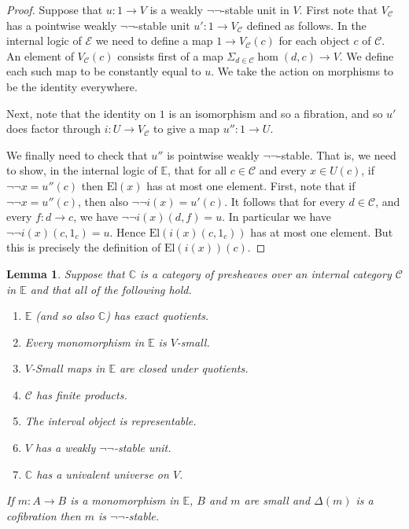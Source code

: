 \documentclass[a4paper]{amsart}
\newtheorem{lemma}[theorem]{Lemma}
\theoremstyle{definition}
\newcommand{\cat}[1]{\mathbb{#1}}
\newcommand{\catc}{\cat{C}}
\newcommand{\smcat}[1]{\mathcal{#1}}
\newcommand{\elu}{\mathrm{El}}
\newcommand{\elv}{\mathrm{El}}
\begin{document}
\begin{proof}
  Suppose that $u \colon 1 \to V$ is a weakly $\neg \neg$-stable
  unit in $V$. First note that $V_\smcat{C}$ has a pointwise weakly
  $\neg \neg$-stable unit $u' \colon 1 \to V_\smcat{C}$ defined as
  follows. In the internal logic of $\smcat{E}$ we need to define a
  map $1 \to V_\smcat{C}(c)$ for each object $c$ of $\smcat{C}$. An
  element of $V_\smcat{C}(c)$ consists first of a map $\Sigma_{d \in
    \smcat{C}} \hom(d, c) \to V$. We define each such map to be constantly
  equal to $u$. We take the action on morphisms to be the identity
  everywhere.
  
  Next, note that the identity on $1$ is an isomorphism and so a
  fibration, and so $u'$ does factor through
  $i \colon U \to V_\smcat{C}$ to give a map $u'' \colon 1 \to U$.

  We finally need to check that $u''$ is pointwise weakly $\neg
  \neg$-stable. That is, we need to show, in the internal logic of
  $\cat{E}$, that for all $c \in \smcat{C}$ and every $x \in U(c)$, if
  $\neg \neg x = u''(c)$ then $\elu(x)$ has at most one element. First,
  note that if $\neg \neg x = u''(c)$, then also $\neg \neg i(x) =
  u'(c)$. It follows that for every $d \in \smcat{C}$, and every
  $f \colon d \to c$, we have $\neg \neg i(x)(d, f) = u$. In
  particular we have $\neg \neg i(x)(c, 1_c) = u$. Hence $\elv(i(x)(c,
  1_c))$ has at most one element. But this is precisely the definition
  of $\elv(i(x))(c)$.
\end{proof}

\begin{lemma}
  \label{lem:negnegunittocof}
  Suppose that $\catc$ is a category of presheaves over an
  internal category $\smcat{C}$ in $\cat{E}$ and that all of the
  following hold.
  \begin{enumerate}
  \item $\cat{E}$ (and so also $\catc$) has exact quotients.
  \item Every monomorphism in $\cat{E}$ is $V$-small.
  \item $V$-Small maps in $\cat{E}$ are closed under quotients.
  \item $\smcat{C}$ has finite products.
  \item The interval object is representable.
  \item $V$ has a weakly $\neg \neg$-stable unit.
  \item $\catc$ has a univalent universe on $V$.
  \end{enumerate}

  If $m \colon A \to B$ is a monomorphism in $\cat{E}$, $B$ and $m$
  are small and $\Delta(m)$ is a cofibration then $m$ is
  $\neg \neg$-stable.
\end{lemma}
\end{document}
